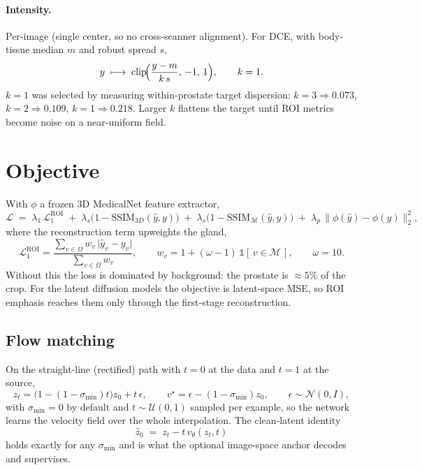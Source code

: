 \documentclass[11pt]{article}
\newcommand{\yhat}{\hat{y}}
\newcommand{\roi}{\mathcal{M}}
\newcommand{\1}{\mathbb{1}}
\begin{document}
\paragraph{Intensity.} Per-image (single center, so no cross-scanner alignment).
For DCE, with body-tissue median $m$ and robust spread $s$,
\begin{equation}
y \;\longmapsto\; \operatorname{clip}\!\Bigl(\frac{y-m}{k\,s},\,-1,\,1\Bigr),\qquad k=1 .
\end{equation}
$k=1$ was selected by measuring within-prostate target dispersion: $k{=}3\Rightarrow 0.073$,
$k{=}2\Rightarrow0.109$, $k{=}1\Rightarrow\mathbf{0.218}$. Larger $k$ flattens the target
until ROI metrics become noise on a near-uniform field.

\section{Objective}

With $\phi$ a frozen 3D MedicalNet feature extractor,
\begin{equation}
\mathcal{L} \;=\; \lambda_1\,\mathcal{L}_{1}^{\text{ROI}}
\;+\;\lambda_s\bigl(1-\mathrm{SSIM}_{3D}(\yhat,y)\bigr)
\;+\;\lambda_s\bigl(1-\mathrm{SSIM}_{\roi}(\yhat,y)\bigr)
\;+\;\lambda_p\,\bigl\|\phi(\yhat)-\phi(y)\bigr\|_2^2 ,
\end{equation}
where the reconstruction term upweights the gland,
\begin{equation}
\mathcal{L}_{1}^{\text{ROI}}=\frac{\sum_{v\in\Omega} w_v\,\lvert \yhat_v-y_v\rvert}{\sum_{v\in\Omega} w_v},
\qquad
w_v = 1 + (\omega-1)\,\1[\,v\in\roi\,],\qquad \omega=10 .
\end{equation}
Without this the loss is dominated by background: the prostate is $\approx5\%$ of the crop.
For the latent diffusion models the objective is latent-space MSE, so ROI emphasis reaches
them only through the first-stage reconstruction.

\subsection{Flow matching}

On the straight-line (rectified) path with $t=0$ at the data and $t=1$ at the source,
\begin{equation}
z_t = \bigl(1-(1-\sigma_{\min})t\bigr)z_0 + t\,\epsilon,
\qquad
v^\star = \epsilon-(1-\sigma_{\min})z_0,
\qquad \epsilon\sim\mathcal{N}(0,I),
\end{equation}
with $\sigma_{\min}=0$ by default and $t\sim\mathcal{U}(0,1)$ sampled per example, so the
network learns the velocity field over the whole interpolation. The clean-latent identity
\begin{equation}
\hat z_0 \;=\; z_t - t\,v_\theta(z_t,t)
\end{equation}
holds exactly for any $\sigma_{\min}$ and is what the optional image-space anchor decodes
and supervises.
\end{document}
